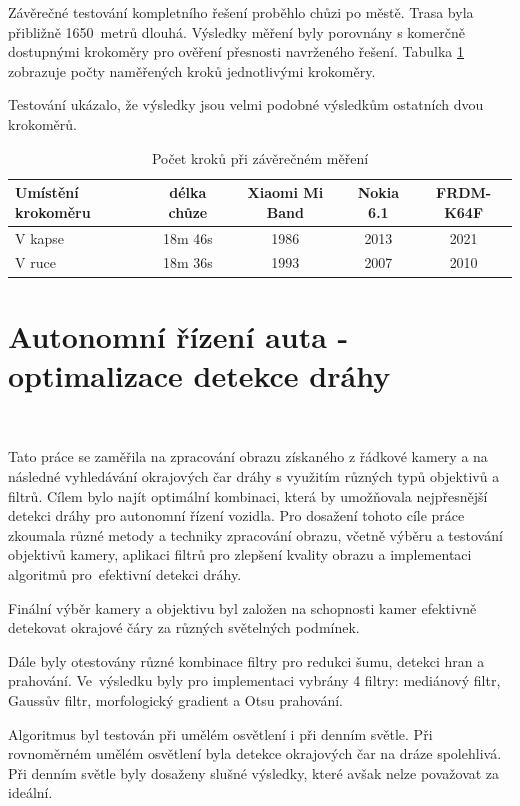 Závěrečné testování kompletního řešení proběhlo chůzi po městě. Trasa byla přibližně 1650~metrů dlouhá. Výsledky měření byly porovnány s komerčně dostupnými krokoměry pro ověření přesnosti navrženého řešení. Tabulka \ref{tab:2}  zobrazuje počty naměřených kroků jednotlivými krokoměry.

Testování ukázalo, že výsledky jsou velmi podobné výsledkům ostatních dvou krokoměrů\cite{krokomer}.

\begin{table}[!htbp]
	\centering
	\begin{tabular}{lcccc}
		\toprule
		Umístění krokoměru & délka chůze & Xiaomi Mi Band & Nokia 6.1 & FRDM-K64F \\
		\midrule
		V kapse            & 18m 46s     & 1986           & 2013      & 2021      \\
		V ruce             & 18m 36s     & 1993           & 2007      & 2010      \\
		\bottomrule
	\end{tabular}
	\caption{Počet kroků při závěrečném měření%
	}
	\label{tab:2}
\end{table}

\section{Autonomní řízení auta - optimalizace detekce dráhy}\

Tato práce se zaměřila na zpracování obrazu získaného z řádkové kamery a na následné vyhledávání okrajových čar dráhy s využitím různých typů objektivů a filtrů. Cílem bylo najít optimální kombinaci, která by umožňovala nejpřesnější detekci dráhy pro autonomní řízení vozidla. Pro dosažení tohoto cíle práce zkoumala různé metody a techniky zpracování obrazu, včetně výběru a testování objektivů kamery, aplikaci filtrů pro zlepšení kvality obrazu a implementaci algoritmů pro~efektivní detekci dráhy.

Finální výběr kamery a objektivu byl založen na schopnosti kamer efektivně detekovat okrajové čáry za různých světelných podmínek.

Dále byly otestovány různé kombinace filtry pro redukci šumu, detekci hran a prahování. Ve~výsledku byly pro implementaci vybrány 4 filtry: mediánový filtr, Gaussův filtr, morfologický gradient a Otsu prahování.

Algoritmus byl testován při umělém osvětlení i při denním světle. Při rovnoměrném umělém osvětlení byla detekce okrajových čar na dráze spolehlivá. Při denním světle byly dosaženy slušné výsledky, které avšak nelze považovat za ideální.\cite{draha}


